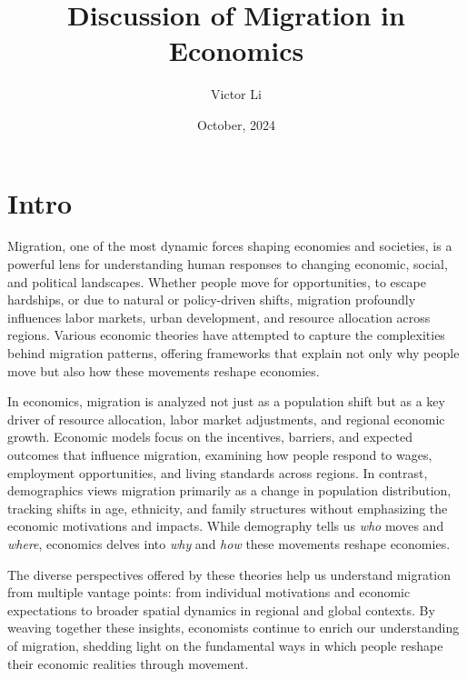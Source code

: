 \documentclass{article}
\title{Discussion of Migration in Economics}
\author{Victor Li}
\date{October, 2024}
\numberwithin{equation}{section} %
\begin{document}
\maketitle



\tableofcontents
{}
\section*{Intro}
\label{sub:intro}

Migration, one of the most dynamic forces shaping economies and societies, is a powerful lens for understanding human responses to changing economic, social, and political landscapes. Whether people move for opportunities, to escape hardships, or due to natural or policy-driven shifts, migration profoundly influences labor markets, urban development, and resource allocation across regions. Various economic theories have attempted to capture the complexities behind migration patterns, offering frameworks that explain not only why people move but also how these movements reshape economies. 

In economics, migration is analyzed not just as a population shift but as a key driver of resource allocation, labor market adjustments, and regional economic growth. Economic models focus on the incentives, barriers, and expected outcomes that influence migration, examining how people respond to wages, employment opportunities, and living standards across regions. In contrast, demographics views migration primarily as a change in population distribution, tracking shifts in age, ethnicity, and family structures without emphasizing the economic motivations and impacts. While demography tells us \textit{who} moves and \textit{where}, economics delves into \textit{why} and \textit{how} these movements reshape economies.

The diverse perspectives offered by these theories help us understand migration from multiple vantage points: from individual motivations and economic expectations to broader spatial dynamics in regional and global contexts. By weaving together these insights, economists continue to enrich our understanding of migration, shedding light on the fundamental ways in which people reshape their economic realities through movement.


\end{document}
